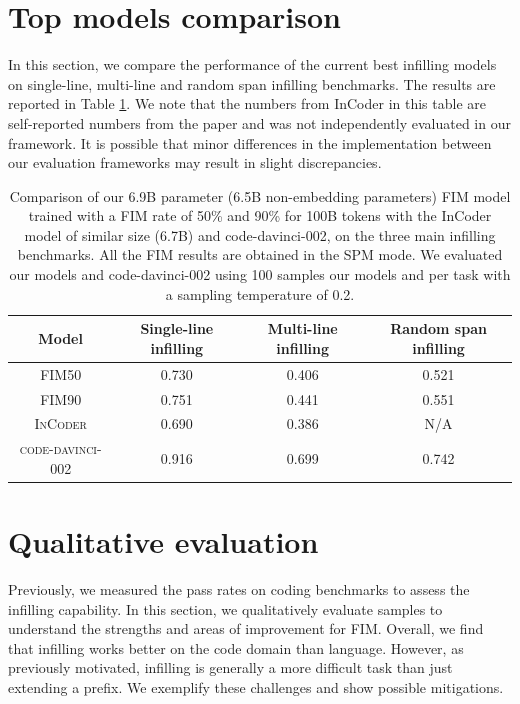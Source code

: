 \documentclass[postscript]{article}
\begin{document}
\section{Top models comparison}\label{appendix:top_model}
In this section, we compare the performance of the current best infilling models on single-line, multi-line and random span infilling benchmarks. The results are reported in Table \ref{tab:top-models}.  We note that the numbers from InCoder in this table are self-reported numbers from the paper and was not independently evaluated in our framework. It is possible that minor differences in the implementation between our evaluation frameworks may result in slight discrepancies.



\begin{table}[ht!]
\centering

\begin{tabular}{cccc}
\hline
Model & Single-line infilling & Multi-line infilling & Random span infilling\\
\hline
\textsc{FIM50} & 0.730 & 0.406 & 0.521\\
\textsc{FIM90} &  0.751 & 0.441 &   0.551 \\
\textsc{InCoder} & 0.690 & 0.386 & N/A \\ \hline
\textsc{code-davinci-002} & 0.916 & 0.699 & 0.742  \\
\hline
\end{tabular}
\caption{Comparison of our 6.9B parameter (6.5B non-embedding parameters) FIM model  trained with a FIM rate of 50\% and 90\% for 100B tokens with the InCoder model of similar size (6.7B) and code-davinci-002, on the three main infilling benchmarks. All the FIM results are obtained in the SPM mode. We evaluated our models and code-davinci-002 using 100 samples our models and per task with a sampling temperature of 0.2.}
\label{tab:top-models}
\end{table}



    


\section{Qualitative evaluation}
\label{appendix:qual_eval}

Previously, we measured the pass rates on coding benchmarks to assess the infilling capability. In this section, we qualitatively evaluate samples to understand the strengths and areas of improvement for FIM. Overall, we find that infilling works better on the code domain than language. However, as previously motivated, infilling is generally a more difficult task than just extending a prefix. We exemplify these challenges and show possible mitigations.
\end{document}
